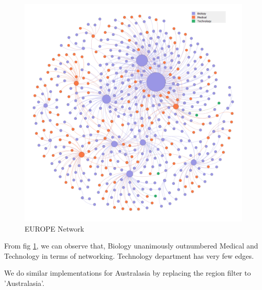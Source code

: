 \documentclass[a4paper,11pt]{article}
\theoremstyle{mytheor}
\begin{document}
\begin{figure}[ht]
    \centering
    \includegraphics[width=15cm]{europenet_legend2.png}
    \caption{EUROPE Network}
    \label{fig:EUROPE Network}
\end{figure} \newpage

From fig \ref{fig:EUROPE Network}, we can observe that, Biology unanimously outnumbered Medical and Technology in terms of networking. Technology department has very few edges. \newline

We do similar implementations for Australasia by replacing the region filter to 'Australasia'.
\end{document}
